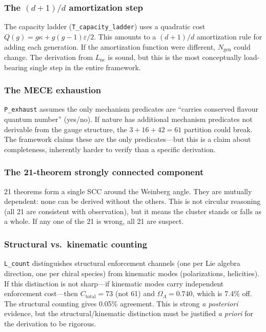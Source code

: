 \documentclass[11pt]{article}
\begin{document}
\subsubsection{The \texorpdfstring{$(d+1)/d$}{(d+1)/d} amortization step}

The capacity ladder (\texttt{T\_capacity\_ladder}) uses a quadratic cost $Q(g) = g\kappa + g(g-1)\varepsilon/2$.  This amounts to a $(d+1)/d$ amortization rule for adding each generation.  If the amortization function were different, $N_{\mathrm{gen}}$ could change.  The derivation from $L_{\mathrm{nc}}$ is sound, but this is the most conceptually load-bearing single step in the entire framework.

\subsubsection{The MECE exhaustion}

\texttt{P\_exhaust} assumes the only mechanism predicates are ``carries conserved flavour quantum number'' (yes/no).  If nature has additional mechanism predicates not derivable from the gauge structure, the $3 + 16 + 42 = 61$ partition could break.  The framework claims these are the only predicates---but this is a claim about completeness, inherently harder to verify than a specific derivation.

\subsubsection{The 21-theorem strongly connected component}

21 theorems form a single SCC around the Weinberg angle.  They are mutually dependent: none can be derived without the others.  This is not circular reasoning (all 21 are consistent with observation), but it means the cluster stands or falls as a whole.  If any one of the 21 is wrong, all 21 are suspect.

\subsubsection{Structural vs.\ kinematic counting}

\texttt{L\_count} distinguishes structural enforcement channels (one per Lie algebra direction, one per chiral species) from kinematic modes (polarizations, helicities).  If this distinction is not sharp---if kinematic modes carry independent enforcement cost---then $C_{\mathrm{total}} = 73$ (not 61) and $\Omega_\Lambda = 0.740$, which is 7.4\% off.  The structural counting gives 0.05\% agreement.  This is strong \emph{a posteriori} evidence, but the structural/kinematic distinction must be justified \emph{a priori} for the derivation to be rigorous.
\end{document}
